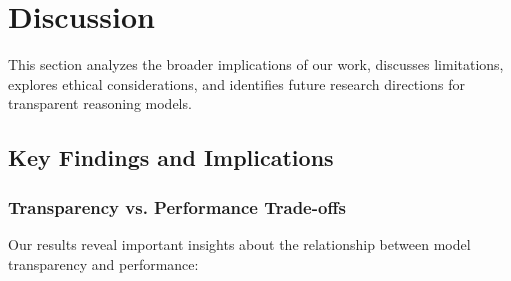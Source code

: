 \section{Discussion}
\label{sec:discussion}

This section analyzes the broader implications of our work, discusses limitations, explores ethical considerations, and identifies future research directions for transparent reasoning models.

\subsection{Key Findings and Implications}

\subsubsection{Transparency vs. Performance Trade-offs}

Our results reveal important insights about the relationship between model transparency and performance:

